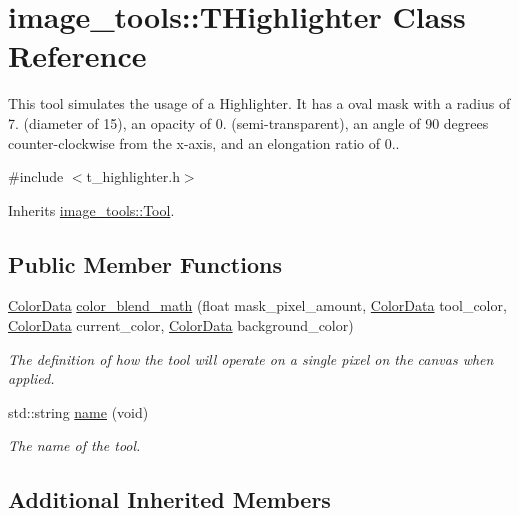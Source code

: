 \hypertarget{classimage__tools_1_1THighlighter}{}\section{image\+\_\+tools\+:\+:T\+Highlighter Class Reference}
\label{classimage__tools_1_1THighlighter}


This tool simulates the usage of a Highlighter. It has a oval mask with a radius of 7. (diameter of 15), an opacity of 0. (semi-\/transparent), an angle of 90 degrees counter-\/clockwise from the x-\/axis, and an elongation ratio of 0..  




{\ttfamily \#include $<$t\+\_\+highlighter.\+h$>$}



Inherits \hyperlink{classimage__tools_1_1Tool}{image\+\_\+tools\+::\+Tool}.

\subsection*{Public Member Functions}
\begin{DoxyCompactItemize}
\item 
\hyperlink{classimage__tools_1_1ColorData}{Color\+Data} \hyperlink{classimage__tools_1_1THighlighter_a79d79961c53317fe6e6ec8fd23fdbff4}{color\+\_\+blend\+\_\+math} (float mask\+\_\+pixel\+\_\+amount, \hyperlink{classimage__tools_1_1ColorData}{Color\+Data} tool\+\_\+color, \hyperlink{classimage__tools_1_1ColorData}{Color\+Data} current\+\_\+color, \hyperlink{classimage__tools_1_1ColorData}{Color\+Data} background\+\_\+color)
\begin{DoxyCompactList}\small\item\em The definition of how the tool will operate on a single pixel on the canvas when applied. \end{DoxyCompactList}\item 
std\+::string \hyperlink{classimage__tools_1_1THighlighter_a741f3c465603450d443f7445ec87c670}{name} (void)
\begin{DoxyCompactList}\small\item\em The name of the tool. \end{DoxyCompactList}\end{DoxyCompactItemize}
\subsection*{Additional Inherited Members}


